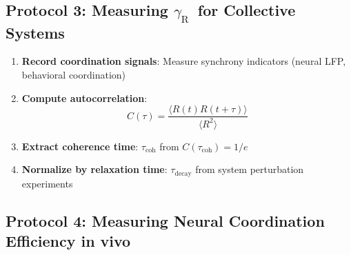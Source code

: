 \documentclass[12pt,a4paper]{article}
\DeclareRobustCommand{\gaR}{\texorpdfstring{\ensuremath{\gamma_{\mathrm{R}}}}{gamma_R}}
\begin{document}
	\subsection{Protocol 3: Measuring \gaR\ for Collective Systems}
	
	\begin{enumerate}
		\item \textbf{Record coordination signals}: Measure synchrony indicators (neural LFP, behavioral coordination)
		\item \textbf{Compute autocorrelation}:
		\[
		C(\tau) = \frac{\langle R(t)R(t+\tau)\rangle}{\langle R^2\rangle}
		\]
		\item \textbf{Extract coherence time}: \(\tau_{\mathrm{coh}}\) from \(C(\tau_{\mathrm{coh}}) = 1/e\)
		\item \textbf{Normalize by relaxation time}: \(\tau_{\mathrm{decay}}\) from system perturbation experiments
	\end{enumerate}
	
	\subsection{Protocol 4: Measuring Neural Coordination Efficiency in vivo}
	\label{subsec:protocol-neural}
	
\end{document}
